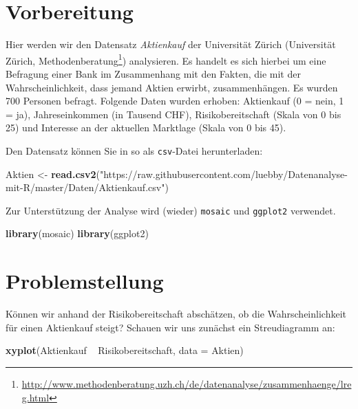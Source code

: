 \documentclass[12pt,]{book}
\makeatletter
\newenvironment{Shaded}{\begin{snugshade}}{\end{snugshade}}
\newcommand{\KeywordTok}[1]{\textcolor[rgb]{0.13,0.29,0.53}{\textbf{{#1}}}}
\newcommand{\DataTypeTok}[1]{\textcolor[rgb]{0.13,0.29,0.53}{{#1}}}
\newcommand{\StringTok}[1]{\textcolor[rgb]{0.31,0.60,0.02}{{#1}}}
\newcommand{\NormalTok}[1]{{#1}}
\renewcommand{\href}[2]{#2\footnote{\url{#1}}}
\newenvironment{kframe}{%
\medskip{}
\setlength{\fboxsep}{.8em}
 \def\at@end@of@kframe{}%
 \ifinner\ifhmode%
  \def\at@end@of@kframe{\end{minipage}}%
  \begin{minipage}{\columnwidth}%
 \fi\fi%
 \def\FrameCommand##1{\hskip\@totalleftmargin \hskip-\fboxsep
 \colorbox{shadecolor}{##1}\hskip-\fboxsep
     \hskip-\linewidth \hskip-\@totalleftmargin \hskip\columnwidth}%
 \MakeFramed {\advance\hsize-\width
   \@totalleftmargin\z@ \linewidth\hsize
   \@setminipage}}%
 {\par\unskip\endMakeFramed%
 \at@end@of@kframe}
\renewenvironment{Shaded}{\begin{kframe}}{\end{kframe}}
\makeatother
\begin{document}
\section{Vorbereitung}\label{vorbereitung}

Hier werden wir den Datensatz \emph{Aktienkauf} der Universität Zürich
(\href{http://www.methodenberatung.uzh.ch/de/datenanalyse/zusammenhaenge/lreg.html}{Universität
Zürich, Methodenberatung}) analysieren. Es handelt es sich hierbei um
eine Befragung einer Bank im Zusammenhang mit den Fakten, die mit der
Wahrscheinlichkeit, dass jemand Aktien erwirbt, zusammenhängen. Es
wurden 700 Personen befragt. Folgende Daten wurden erhoben: Aktienkauf
(0 = nein, 1 = ja), Jahreseinkommen (in Tausend CHF), Risikobereitschaft
(Skala von 0 bis 25) und Interesse an der aktuellen Marktlage (Skala von
0 bis 45).

Den Datensatz können Sie in so als \texttt{csv}-Datei herunterladen:

\begin{Shaded}
\begin{Highlighting}[]
\NormalTok{Aktien <-}\StringTok{ }\KeywordTok{read.csv2}\NormalTok{(}\StringTok{"https://raw.githubusercontent.com/luebby/Datenanalyse-mit-R/master/Daten/Aktienkauf.csv"}\NormalTok{)}
\end{Highlighting}
\end{Shaded}

Zur Unterstützung der Analyse wird (wieder) \texttt{mosaic} und
\texttt{ggplot2} verwendet.

\begin{Shaded}
\begin{Highlighting}[]
\KeywordTok{library}\NormalTok{(mosaic)}
\KeywordTok{library}\NormalTok{(ggplot2)}
\end{Highlighting}
\end{Shaded}

\section{Problemstellung}\label{problemstellung}

Können wir anhand der Risikobereitschaft abschätzen, ob die
Wahrscheinlichkeit für einen Aktienkauf steigt? Schauen wir uns zunächst
ein Streudiagramm an:

\begin{Shaded}
\begin{Highlighting}[]
\KeywordTok{xyplot}\NormalTok{(Aktienkauf ~}\StringTok{ }\NormalTok{Risikobereitschaft, }\DataTypeTok{data =} \NormalTok{Aktien)}
\end{Highlighting}
\end{Shaded}
\end{document}
